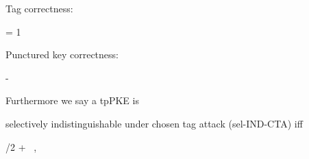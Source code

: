 \begin{definition}
\begin{sitemize}
        \item Tag correctness:
        \begin{bralign}
            = 1
        \end{bralign}

        \item Punctured key correctness:
        \begin{bralign}
             - \negl\parr{\secpar}
        \end{bralign}
    \end{sitemize}
    Furthermore we say a tpPKE is
    \begin{sitemize}
        \item selectively indistinguishable under chosen tag attack (sel-IND-CTA) iff
        \begin{bralign}
            /2 + \negl\parr{\secpar}
            \ ,
        \end{bralign}


\end{sitemize}
\end{definition}
